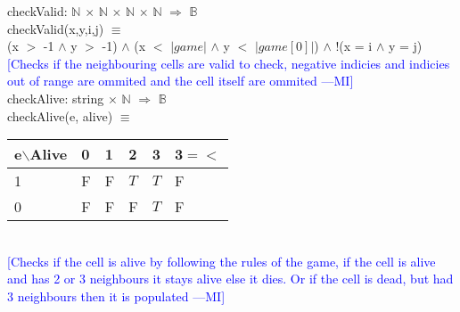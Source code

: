 \documentclass{article}
\newcommand{\authornote}[3]{\textcolor{#1}{[#3 ---#2]}}
\newcommand{\authornote}[3]{}
\newcommand{\wss}[1]{\authornote{blue}{MI}{#1}}
\begin{document}
\noindent checkValid: $\mathbb{N}$ $\times$ $\mathbb{N}$ $\times$ $\mathbb{N}$ $\times$ $\mathbb{N}$ $\Rightarrow$ $\mathbb{B}$ \\
checkValid(x,y,i,j) $\equiv$ \\
\indent (x $>$ -1 $\land$ y $>$ -1) $\land$ (x $<$ $|game|$ $\land$ y $<$ $|game[0]|$) $\land$ !(x = i $\land$ y = j) \\
\wss{Checks if the neighbouring cells are valid to check, negative indicies and indicies out of range are ommited and the cell itself are ommited} \\

\noindent checkAlive: string $\times$ $\mathbb{N}$ $\Rightarrow$  $\mathbb{B}$\\
checkAlive(e, alive) $\equiv$ \\
\begin{table}[!ht]
    \begin{tabular}{|l|l|l|l|l|l|}
        \hline
        e$\backslash$Alive & 0     & 1     & 2     & 3    & 3$=<$   \\ \hline
        1       & F & F & $T$  & $T$ & F \\ \hline
        0       & F & F & F & $T$ & F \\
        \hline
    \end{tabular}
\end{table}\\

\wss{Checks if the cell is alive by following the rules of the game, if the cell is alive and has 2 or 3 neighbours it stays alive else it dies. Or if the cell is dead, but had 3 neighbours then it is populated} \\
\end{document}

